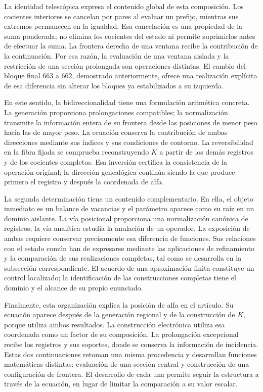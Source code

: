 La identidad telescópica expresa el contenido global de esta composición.
Los cocientes interiores se cancelan por pares al evaluar un prefijo,
mientras sus extremos permanecen en la igualdad. Esa cancelación es una
propiedad de la suma ponderada; no elimina los cocientes del estado ni
permite suprimirlos antes de efectuar la suma. La frontera derecha de una
ventana recibe la contribución de la continuación. Por esa razón, la
evaluación de una ventana aislada y la restricción de una sección
prolongada son operaciones distintas. El cambio del bloque final $663$ a
$662$, demostrado anteriormente, ofrece una realización explícita de esa
diferencia sin alterar los bloques ya estabilizados a su izquierda.

En este sentido, la bidireccionalidad tiene una formulación aritmética
concreta. La generación proporciona prolongaciones compatibles; la
normalización transmite la información entera de su frontera desde las
posiciones de menor peso hacia las de mayor peso. La ecuación conserva la
contribución de ambas direcciones mediante sus índices y sus condiciones
de contorno. La reversibilidad en la fibra fijada se comprueba reconstruyendo
$K$ a partir de los demás registros y de los cocientes completos. Esa
inversión certifica la consistencia de la operación original; la dirección
genealógica continúa siendo la que produce primero el registro y después
la coordenada de alfa.

La segunda determinación tiene un contenido complementario. En ella, el
objeto inmediato es un balance de vacancias y el parámetro aparece como
su raíz en un dominio aislante. La vía posicional proporciona una
normalización canónica de registros; la vía analítica estudia la anulación
de un operador. La exposición de ambas requiere conservar precisamente
esa diferencia de funciones. Sus relaciones con el estado común han de
expresarse mediante las aplicaciones de refinamiento y la comparación de
sus realizaciones completas, tal como se desarrolla en la subsección
correspondiente. El acuerdo de una aproximación finita constituye un
control localizado; la identificación de las construcciones completas
tiene el dominio y el alcance de su propio enunciado.

Finalmente, esta organización explica la posición de alfa en el artículo.
Su ecuación aparece después de la generación regional y de la construcción
de $K$, porque utiliza ambos resultados. La construcción electrónica
utiliza esa coordenada como un factor de su composición. La prolongación
excepcional recibe los registros y sus soportes, donde se conserva la
información de incidencia. Estas dos continuaciones retoman una misma
procedencia y desarrollan funciones matemáticas distintas: evaluación de
una sección central y construcción de una configuración de frontera.
El desarrollo de cada una permite seguir la estructura a través de la
ecuación, en lugar de limitar la comparación a su valor escalar.
